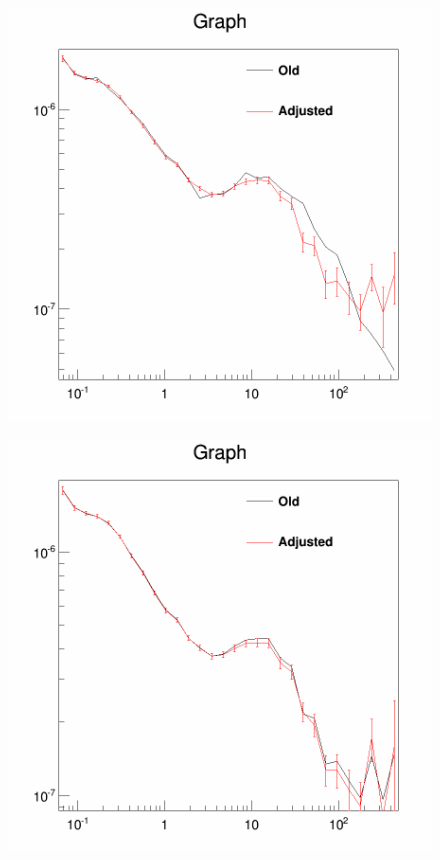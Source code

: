 \newpage
\begin{figure}[H]
  \centering
  \begin{minipage}[h]{0.45\textwidth}
  	\centering
	\includegraphics[width=1.\linewidth]{pic/method/app_iso_process_1.png}
  	\subcaption{}
  	\label{app:app_iso_process_1}
  \end{minipage}
  \hfill
  \begin{minipage}[h]{0.45\textwidth}
  	\centering
	\includegraphics[width=1.\linewidth]{pic/method/app_iso_process_2.png}

\end{minipage}
\end{figure}

